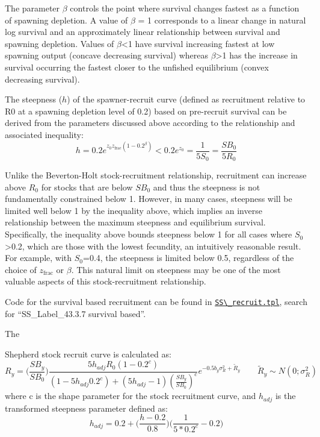 The parameter $\beta$ controls the point where survival changes fastest as a function of spawning depletion. A value of $\beta$ = 1 corresponds to a linear change in natural log survival and an approximately linear relationship between survival and spawning depletion. Values of $\beta$<1 have survival increasing fastest at low spawning output (concave decreasing survival) whereas $\beta$>1 has the increase in survival occurring the fastest closer to the unfished equilibrium (convex decreasing survival).

The steepness ($h$) of the spawner-recruit curve (defined as recruitment relative to R0 at a spawning depletion level of 0.2) based on pre-recruit survival can be derived from the parameters discussed above according to the relationship and associated inequality:
\begin{equation}
h = 0.2e^{z_0z_{\text{frac}}(1-0.2^\beta)}<0.2e^{z_0}=\frac{1}{5S_0}=\frac{SB_0}{5R_0}
\end{equation}

Unlike the Beverton-Holt stock-recruitment relationship, recruitment can increase above $R_0$ for stocks that are below $SB_0$ and thus the steepness is not fundamentally constrained below 1. However, in many cases, steepness will be limited well below 1 by the inequality above, which implies an inverse relationship between the maximum steepness and equilibrium survival. Specifically, the inequality above bounds steepness below 1 for all cases where $S_0$>0.2, which are those with the lowest fecundity, an intuitively reasonable result. For example, with $S_0$=0.4, the steepness is limited below 0.5, regardless of the choice of $z_{\text{frac}}$ or $\beta$. This natural limit on steepness may be one of the most valuable aspects of this stock-recruitment relationship.

Code for the survival based recruitment can be found in \href{https://github.com/nmfs-ost/ss3-source-code/blob/main/SS_recruit.tpl}{\verb|SS\_recruit.tpl|}, search for ``SS\_Label\_43.3.7 survival based''.

\hypertarget{Shepherd}{The} Shepherd stock recruit curve is calculated as:
\begin{equation}
R_y = \bigg(\frac{SB_y}{SB_0}\bigg)\frac{5h_{adj}R_0(1-0.2^c)}{(1-5h_{adj}0.2^c)+(5h_{adj}-1)(\frac{SB_y}{SB_0})^c}e^{-0.5b_y\sigma^2_R+\tilde{R}_y}\qquad \tilde{R}_y\sim N(0;\sigma^2_R)
\end{equation}
where c is the shape parameter for the stock recruitment curve, and $h_{adj}$ is the transformed steepness parameter defined as:
\begin{equation}
h_{adj}=0.2+\bigg(\frac{h-0.2}{0.8}\bigg)\bigg(\frac{1}{5*0.2^c}-0.2\bigg)
\end{equation}

